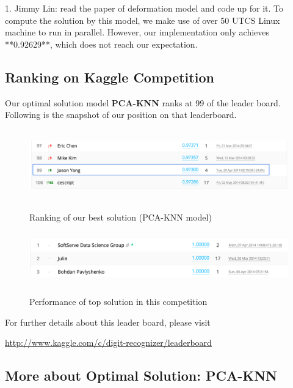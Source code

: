 \documentclass{article} %
\begin{document}
1. Jimmy Lin: read the paper of deformation model and code up for it. To
compute the solution by this model, we make use of over 50 UTCS Linux machine
to run in parallel. However, our implementation only achieves **0.92629**,
which does not reach our expectation.

\subsection{Ranking on Kaggle Competition}

Our optimal solution model {\bf PCA-KNN} ranks at 99 of the leader board.
Following is the snapshot of our position on that leaderboard.

\begin{figure}[h]
    \centering
    \includegraphics[width=5.5in,height=1.2in]{./images/Rank.png} \\
    \caption{Ranking of our best solution (PCA-KNN model)}
\end{figure}

\begin{figure}[h]
    \centering
    \includegraphics[width=5.5in,height=0.9in]{./images/topRank.png} \\
    \caption{Performance of top solution in this competition}
\end{figure}
For further details about this leader board, please visit
\begin{center}
\url{http://www.kaggle.com/c/digit-recognizer/leaderboard} 
\end{center}

\subsection{More about Optimal Solution: PCA-KNN}
\end{document}
